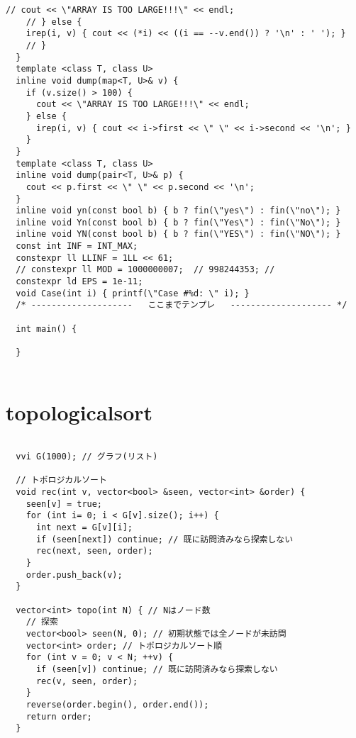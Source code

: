 \documentclass{jsarticle}
\begin{document}
\begin{lstlisting}[caption=templete]
    // cout << \"ARRAY IS TOO LARGE!!!\" << endl;
    // } else {
    irep(i, v) { cout << (*i) << ((i == --v.end()) ? '\n' : ' '); }
    // }
  }
  template <class T, class U>
  inline void dump(map<T, U>& v) {
    if (v.size() > 100) {
      cout << \"ARRAY IS TOO LARGE!!!\" << endl;
    } else {
      irep(i, v) { cout << i->first << \" \" << i->second << '\n'; }
    }
  }
  template <class T, class U>
  inline void dump(pair<T, U>& p) {
    cout << p.first << \" \" << p.second << '\n';
  }
  inline void yn(const bool b) { b ? fin(\"yes\") : fin(\"no\"); }
  inline void Yn(const bool b) { b ? fin(\"Yes\") : fin(\"No\"); }
  inline void YN(const bool b) { b ? fin(\"YES\") : fin(\"NO\"); }
  const int INF = INT_MAX;
  constexpr ll LLINF = 1LL << 61;
  // constexpr ll MOD = 1000000007;  // 998244353; //
  constexpr ld EPS = 1e-11;
  void Case(int i) { printf(\"Case #%d: \" i); }
  /* --------------------   ここまでテンプレ   -------------------- */
  
  int main() {
    
  }
  

\end{lstlisting}

\color{white}
\section{topologicalsort}
\color{black}
\begin{lstlisting}[caption=topologicalsort]

  vvi G(1000); // グラフ(リスト)
  
  // トポロジカルソート
  void rec(int v, vector<bool> &seen, vector<int> &order) {
    seen[v] = true;
    for (int i= 0; i < G[v].size(); i++) {
      int next = G[v][i];
      if (seen[next]) continue; // 既に訪問済みなら探索しない
      rec(next, seen, order);
    }
    order.push_back(v);
  }
  
  vector<int> topo(int N) { // Nはノード数
    // 探索
    vector<bool> seen(N, 0); // 初期状態では全ノードが未訪問
    vector<int> order; // トポロジカルソート順
    for (int v = 0; v < N; ++v) {
      if (seen[v]) continue; // 既に訪問済みなら探索しない
      rec(v, seen, order);
    }
    reverse(order.begin(), order.end());
    return order;
  }
  

\end{lstlisting}

\color{white}
\end{document}
